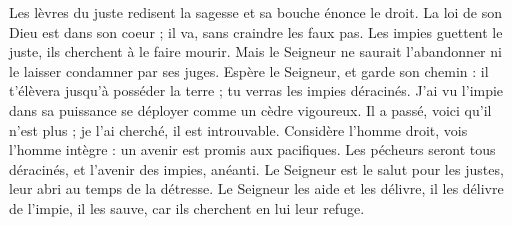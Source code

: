 Les lèvres du juste redisent la sagesse et sa bouche énonce le droit.
\versseparator
La loi de son Dieu est dans son coeur ; il va, sans craindre les faux pas.
\versseparator
Les impies guettent le juste, ils cherchent à le faire mourir.
\versseparator
Mais le Seigneur ne saurait l'abandonner ni le laisser condamner par ses juges.
\versseparator
Espère le Seigneur, et garde son chemin : il t'élèvera jusqu'à posséder la terre ; tu verras les impies déracinés.
\versseparator
J'ai vu l'impie dans sa puissance se déployer comme un cèdre vigoureux.
\versseparator
Il a passé, voici qu'il n'est plus ; je l'ai cherché, il est introuvable.
\versseparator
Considère l'homme droit, vois l'homme intègre : un avenir est promis aux pacifiques.
\versseparator
Les pécheurs seront tous déracinés, et l'avenir des impies, anéanti.
\versseparator
Le Seigneur est le salut pour les justes, leur abri au temps de la détresse.
\versseparator
Le Seigneur les aide et les délivre, il les délivre de l'impie, il les sauve, car ils cherchent en lui leur refuge.
